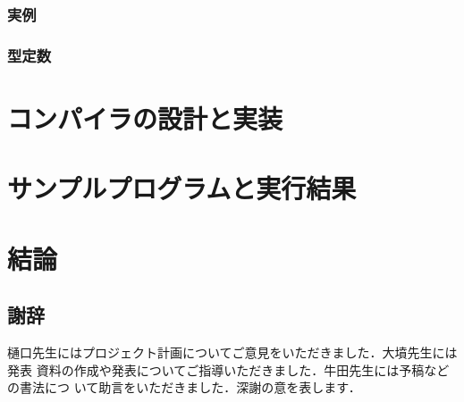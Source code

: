 \documentclass[a4paper,titlepage,report]{jsbook}
\begin{document}
\subsection{実例}\label{ssc:example}

\subsection{型定数}\label{ssc:type-constant}


\chapter{コンパイラの設計と実装}\label{ch:impl}

\chapter{サンプルプログラムと実行結果}\label{ch:sample-program}

\chapter{結論}\label{ch:conclude}

\section*{謝辞}
樋口先生にはプロジェクト計画についてご意見をいただきました．大墳先生には発表
資料の作成や発表についてご指導いただきました．牛田先生には予稿などの書法につ
いて助言をいただきました．深謝の意を表します．




\backmatter
\appendix
\end{document}
